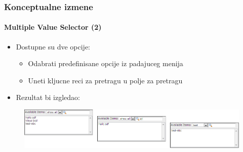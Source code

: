 \begin{frame}[fragile]
	\frametitle{Konceptualne izmene}
	\framesubtitle{Multiple Value Selector (2)}

	\begin{itemize}
		\item Dostupne su dve opcije:

			\begin{itemize}
				\item Odabrati predefinisane opcije iz padajuceg menija
				\item Uneti kljucne reci za pretragu u polje za pretragu
			\end{itemize}

		\item Rezultat bi izgledao:
	\end{itemize}

	\begin{figure}
		\includegraphics[width=1\linewidth]{Images/InDepthChanges/MultipleValueSelector.png}
	\end{figure}

\end{frame}


